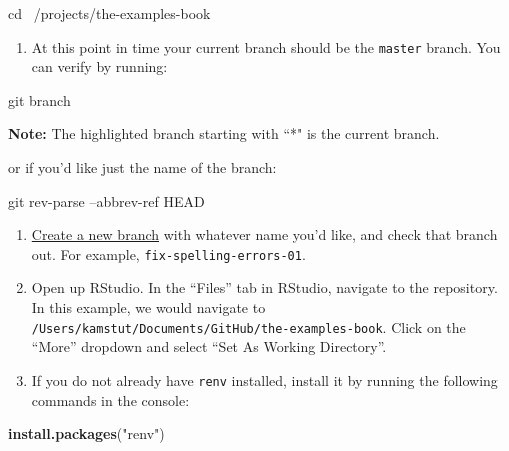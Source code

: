 \documentclass[]{book}
\newenvironment{Shaded}{\begin{snugshade}}{\end{snugshade}}
\newcommand{\KeywordTok}[1]{\textcolor[rgb]{0.13,0.29,0.53}{\textbf{#1}}}
\newcommand{\StringTok}[1]{\textcolor[rgb]{0.31,0.60,0.02}{#1}}
\newcommand{\FunctionTok}[1]{\textcolor[rgb]{0.00,0.00,0.00}{#1}}
\newcommand{\BuiltInTok}[1]{#1}
\newcommand{\NormalTok}[1]{#1}
\providecommand{\tightlist}{%
  \setlength{\itemsep}{0pt}\setlength{\parskip}{0pt}}
\begin{document}
\begin{Shaded}
\begin{Highlighting}[]
\BuiltInTok{cd}\NormalTok{ ~/projects/the-examples-book}
\end{Highlighting}
\end{Shaded}

\begin{enumerate}
\def\labelenumi{\arabic{enumi}.}
\setcounter{enumi}{5}
\tightlist
\item
  At this point in time your current branch should be the
  \texttt{master} branch. You can verify by running:
\end{enumerate}

\begin{Shaded}
\begin{Highlighting}[]
\FunctionTok{git}\NormalTok{ branch}
\end{Highlighting}
\end{Shaded}

\textbf{Note:} The highlighted branch starting with ``*" is the current
branch.

or if you'd like just the name of the branch:

\begin{Shaded}
\begin{Highlighting}[]
\FunctionTok{git}\NormalTok{ rev-parse --abbrev-ref HEAD}
\end{Highlighting}
\end{Shaded}

\begin{enumerate}
\def\labelenumi{\arabic{enumi}.}
\setcounter{enumi}{6}
\item
  \protect\hyperlink{git-create-new-branch}{Create a new branch} with
  whatever name you'd like, and check that branch out. For example,
  \texttt{fix-spelling-errors-01}.
\item
  Open up RStudio. In the ``Files'' tab in RStudio, navigate to the
  repository. In this example, we would navigate to
  \texttt{/Users/kamstut/Documents/GitHub/the-examples-book}. Click on
  the ``More'' dropdown and select ``Set As Working Directory''.
\item
  If you do not already have \texttt{renv} installed, install it by
  running the following commands in the console:
\end{enumerate}

\begin{Shaded}
\begin{Highlighting}[]
\KeywordTok{install.packages}\NormalTok{(}\StringTok{"renv"}\NormalTok{)}
\end{Highlighting}
\end{Shaded}
\end{document}

